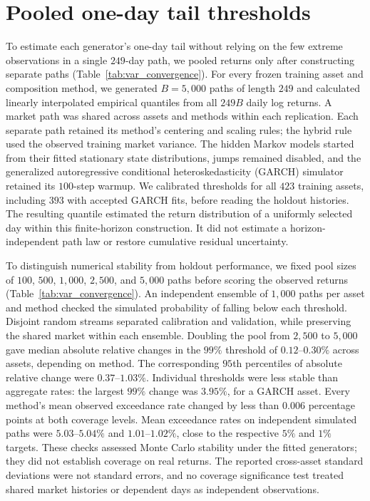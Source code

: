 \clearpage
\section{Pooled one-day tail thresholds}
\label{sec:supp-var-ensemble}

To estimate each generator's one-day tail without relying on the few
extreme observations in a single $249$-day path, we pooled returns
only after constructing separate paths
(Table~\ref{tab:var_convergence}). For every frozen training
asset and composition method, we generated $B=5{,}000$ paths of
length $249$ and calculated linearly interpolated empirical quantiles
from all $249B$ daily log returns. A market path was shared across
assets and methods within each replication. Each separate path retained its method's centering and scaling
rules; the hybrid rule used the observed training market variance. The hidden Markov models
started from their fitted stationary state distributions, jumps
remained disabled, and the generalized autoregressive conditional
heteroskedasticity (GARCH) simulator retained its $100$-step warmup.
We calibrated thresholds for all $423$ training assets, including
$393$ with accepted GARCH fits, before reading the holdout histories.
The resulting quantile estimated the return distribution of a
uniformly selected day within this finite-horizon construction.
It did not estimate a horizon-independent path law or restore
cumulative residual uncertainty.

To distinguish numerical stability from holdout performance, we fixed
pool sizes of $100$, $500$, $1{,}000$, $2{,}500$, and $5{,}000$ paths
before scoring the observed returns
(Table~\ref{tab:var_convergence}). An independent ensemble of
$1{,}000$ paths per asset and method checked the simulated probability
of falling below each threshold. Disjoint random streams separated
calibration and validation, while preserving the shared market within
each ensemble. Doubling the pool from $2{,}500$ to $5{,}000$ gave median absolute
relative changes in the $99\%$ threshold of $0.12$--$0.30\%$ across
assets, depending on method. The corresponding $95$th percentiles of absolute relative
change were $0.37$--$1.03\%$. Individual thresholds were less stable
than aggregate rates: the largest $99\%$ change was $3.95\%$, for a
GARCH asset. Every method's mean observed exceedance rate changed by
less than $0.006$ percentage points at both coverage levels. Mean
exceedance rates on independent simulated paths were
$5.03$--$5.04\%$ and $1.01$--$1.02\%$, close to the respective
$5\%$ and $1\%$ targets. These checks assessed Monte Carlo stability
under the fitted generators; they did not establish coverage on real
returns. The reported cross-asset standard deviations were not
standard errors, and no coverage significance test treated shared
market histories or dependent days as independent observations.


